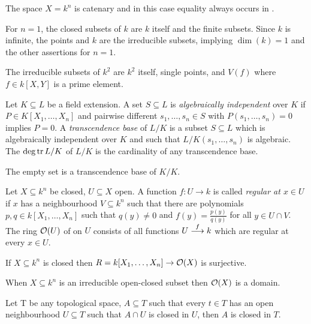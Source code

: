 \documentclass[a4paper,parskip=full,numbers=enddot]{scrreprt}
\begin{document}
\setcounter{thm}{4}
\begin{thm}
 The space $X=k^n$ is catenary and in this case equality always occurs in .
\end{thm}
\begin{example}
 For $n=1$, the closed subsets of $k$ are $k$ itself and the finite subsets. Since $k$ is infinite, the points and $k$ are the irreducible subsets, implying $\dim(k) = 1 $ and the other assertions for $n=1$.
\end{example}
\begin{example}
 The irreducible subsets of $k^2$ are $k^2$ itself, single points, and $V(f)$ where $f\in k[X,Y]$ is a prime element.
\end{example}
\begin{defi}
    Let $K\subseteq L$ be a field extension. A set $S\subseteq L$ is \emph{algebraically independent} over $K$ if $P\in K[X_1,\ldots,X_n]$ and pairwise different $s_1,\ldots, s_n\in S$ with $P(s_1,\ldots, s_n) =0$ implies $P=0$. A \emph{transcendence base} of $L/K$ is a subset $S\subseteq L$ which is algebraically independent over $K$ and such that $L/K(s_1,\ldots,s_n)$ is algebraic. The  $\deg\tr L/K$ of $L/K$ is the cardinality of any transcendence base.
\end{defi}
\begin{example*}
 The empty set is a transcendence base of $K/K$. 
 \end{example*}
\begin{defi} 
    Let $X\subseteq k^n$ be closed, $U\subseteq X$ open. A function $f\colon U\to k$ is called \emph{regular at $x\in U$} if $x$ has a neighbourhood $V\subseteq k^n$ such that there are polynomials $p,q\in k[X_1,\ldots,X_n]$ such that $q(y) \neq 0$ and $f(y) = \frac{p(y)}{q(y)}$ for all $y\in U\cap V$. The ring $\Oo(U)$ of  on $U$ consists of all functions $U\morphism[f] k$ which are regular at every $x\in U$.
\end{defi}
\begin{prop}
    If $X\subseteq k^n$ is closed then $R= k[X_1,\ldots, X_n] \to \Oo(X)$ is surjective.
\end{prop}
\begin{rem}
    When $X\subseteq k^n$ is an irreducible open-closed subset then $\Oo(X)$ is a domain. 
\end{rem}
\begin{rem}
    Let T be any topological space, $A\subseteq T$ such that every $t\in T$ has an open neighbourhood $U\subseteq T$ such that $A\cap U$ is closed in $U$, then $A$ is closed in $T$.
\end{rem}
\end{document}
